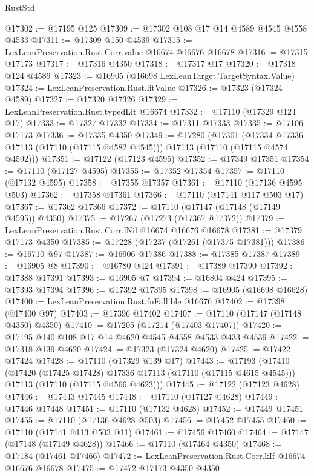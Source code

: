 \begin{lexlean}{RustStd}
\begin{coremodule}
@17302 := @17195 @125
@17309 := @17302 @108 @17 @14 @4589 @4545 @4558 @4533
@17311 := @17309 @150 @4539
@17315 := LexLeanPreservation.Rust.Corr.value @16674 @16676 @16678
@17316 := @17315 @17173
@17317 := @17316 @4350
@17318 := @17317 @17
@17320 := @17318 @124 @4589
@17323 := @16905 (@16698 LexLeanTarget.TargetSyntax.Value)
@17324 := LexLeanPreservation.Rust.litValue
@17326 := @17323 (@17324 @4589)
@17327 := @17320 @17326
@17329 := LexLeanPreservation.Rust.typedLit @16674
@17332 := @17110 (@17329 @124 @17)
@17333 := @17327 @17332
@17334 := @17311 @17333
@17335 := @17106 @17173
@17336 := @17335 @4350
@17349 := @17280
    (@17301
      (@17334 @17336 @17113 (@17110 (@17115 @4582 @4545)))
      @17113
      (@17110 (@17115 @4574 @4592)))
@17351 := @17122 (@17123 @4595)
@17352 := @17349 @17351
@17354 := @17110 (@17127 @4595)
@17355 := @17352 @17354
@17357 := @17110 (@17132 @4595)
@17358 := @17355 @17357
@17361 := @17110 (@17136 @4595 @503)
@17362 := @17358 @17361
@17366 := @17110 (@17141 @117 @503 @17)
@17367 := @17362 @17366
@17372 := @17110 (@17147 (@17148 (@17149 @4595)) @4350)
@17375 := @17267 (@17273 (@17367 @17372))
@17379 := LexLeanPreservation.Rust.Corr.lNil @16674 @16676 @16678
@17381 := @17379 @17173 @4350
@17385 := @17228 (@17237 (@17261 (@17375 @17381)))
@17386 := @16710 @97
@17387 := @16906 @17386
@17388 := @17385 @17387
@17389 := @16905 @8
@17390 := @16780 @424
@17391 := @17389 @17390
@17392 := @17388 @17391
@17393 := @16905 @7
@17394 := @16804 @424
@17395 := @17393 @17394
@17396 := @17392 @17395
@17398 := @16905 (@16698 @16628)
@17400 := LexLeanPreservation.Rust.fnFallible @16676
@17402 := @17398 (@17400 @97)
@17403 := @17396 @17402
@17407 := @17110 (@17147 (@17148 @4350) @4350)
@17410 := @17205 (@17214 (@17403 @17407))
@17420 := @17195 @140 @108 @17 @14 @4620 @4545 @4558 @4533 @433 @4539
@17422 := @17318 @139 @4620
@17424 := @17323 (@17324 @4620)
@17425 := @17422 @17424
@17428 := @17110 (@17329 @139 @17)
@17443 := @17193
    (@17410
      (@17420 (@17425 @17428) @17336 @17113 (@17110 (@17115 @4615 @4545)))
      @17113
      (@17110 (@17115 @4566 @4623)))
@17445 := @17122 (@17123 @4628)
@17446 := @17443 @17445
@17448 := @17110 (@17127 @4628)
@17449 := @17446 @17448
@17451 := @17110 (@17132 @4628)
@17452 := @17449 @17451
@17455 := @17110 (@17136 @4628 @503)
@17456 := @17452 @17455
@17460 := @17110 (@17141 @113 @503 @11)
@17461 := @17456 @17460
@17464 := @17147 (@17148 (@17149 @4628))
@17466 := @17110 (@17464 @4350)
@17468 := @17184 (@17461 @17466)
@17472 := LexLeanPreservation.Rust.Corr.kIf @16674 @16676 @16678
@17475 := @17472 @17173 @4350 @4350

\end{coremodule}
\end{lexlean}
